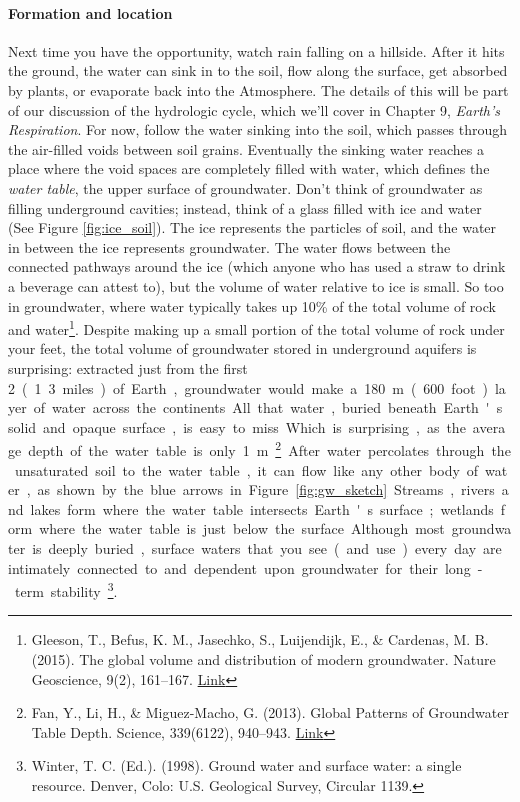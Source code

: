 \documentclass[amstex,12pt]{book}
\begin{document}
\paragraph{Formation and location}
Next time you have the opportunity, watch rain falling on a hillside. After it hits the ground, the water can sink in to the soil, flow along the surface, get absorbed by plants, or evaporate back into the Atmosphere. The details of this will be part of our discussion of the hydrologic cycle, which we'll cover in Chapter 9, \textit{Earth's Respiration}. For now, follow the water sinking into the soil, which passes through the air-filled voids between soil grains. Eventually the sinking water reaches a place where the void spaces are completely filled with water, which defines the \emph{water table}, the upper surface of groundwater. Don't think of groundwater as filling underground cavities; instead, think of a glass filled with ice and water (See Figure \ref{fig:ice_soil}). The ice represents the particles of soil, and the water in between the ice represents groundwater. The water flows between the connected pathways around the ice (which anyone who has used a straw to drink a beverage can attest to), but the volume of water relative to ice is small. So too in groundwater, where water typically takes up 10\% of the total volume of rock and water\footnote{Gleeson, T., Befus, K. M., Jasechko, S., Luijendijk, E., \& Cardenas, M. B. (2015). The global volume and distribution of modern groundwater. Nature Geoscience, 9(2), 161–167. \href{https://doi.org/10.1038/ngeo2590}{Link}}. Despite making up a small portion of the total volume of rock under your feet, the total volume of groundwater stored in underground aquifers is surprising: extracted just from the first \SI{2}[{\kilo}{\metre}] (1.3 miles) of Earth, groundwater would make a \SI{180}{\metre} (600 foot) layer of water across the continents. All that water, buried beneath Earth's solid and opaque surface, is easy to miss.

Which is surprising, as the average depth of the water table is only \SI{1}{\metre}\footnote{Fan, Y., Li, H., \& Miguez-Macho, G. (2013). Global Patterns of Groundwater Table Depth. Science, 339(6122), 940–943. \href{https://doi.org/DOI: 10.1126/science.1229881}{Link}}. After water percolates through the unsaturated soil to the water table, it can flow like any other body of water, as shown by the blue arrows in Figure \ref{fig:gw_sketch}. Streams, rivers and lakes form where the water table intersects Earth's surface; wetlands form where the water table is just below the surface. Although most groundwater is deeply buried, surface waters that you see (and use) every day are intimately connected to and dependent upon groundwater for their long-term stability\footnote{Winter, T. C. (Ed.). (1998). Ground water and surface water: a single resource. Denver, Colo: U.S. Geological Survey, Circular 1139.}. 
\end{document}
